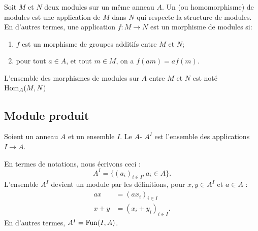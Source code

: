 \begin{definition}
  Soit \( M \) et \( N \) deux modules sur un même anneau \( A \). Un  (ou homomorphisme) de modules est une application de \( M \) dans \( N \) qui respecte la structure de modules. En d'autres termes, une application \( f : M \to N \) est un morphisme de modules si:
  \begin{enumerate}
    \item
      \( f \) est un morphisme de groupes additifs entre \( M \) et \( N \);
    \item
      pour tout \( a \in A\), et tout \(m  \in M\), on a \( f(am) = a f(m) \).
  \end{enumerate}
  L'ensemble des morphismes de modules sur \( A \) entre \(M \) et \( N \) est noté \( \operatorname{Hom}_A(M, N)\)
\end{definition}



\subsection{Module produit}

\begin{lemmaDef}        \label{DEFooLCJEooBvVmkV}
    Soient un anneau \( A\) et un ensemble \( I\). Le \( A\)- \( A^I\) est l'ensemble des applications \( I\to A\).

    En termes de notations, nous écrivons ceci :
    \begin{equation}
        A^I=\{ (a_i)_{i\in I},a_i\in A \}.
    \end{equation}
    L'ensemble \( A^I\) devient un module par les définitions, pour \( x,y\in A^I\) et \( a\in A\) :
    \begin{subequations}
        \begin{align}
            ax&=(ax_i)_{i\in I}\\
            x+y&=(x_i+y_i)_{i\in I}     \label{EQooODBMooQKLUgd}.
        \end{align}
    \end{subequations}
    En d'autres termes, \( A^I=\operatorname{Fun}(I,A)\).
\end{lemmaDef}

